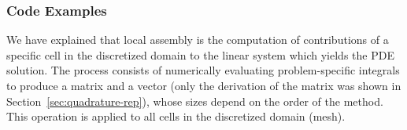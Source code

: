 %
%



\subsubsection{Code Examples}
\label{sec:bkg:mathcode}
We have explained that local assembly is the computation of contributions of a specific cell in the discretized domain to the linear system which yields the PDE solution. The process consists of numerically evaluating problem-specific integrals to produce a matrix and a vector (only the derivation of the matrix was shown in Section~\ref{sec:quadrature-rep}), whose sizes depend on the order of the method. This operation is applied to all cells in the discretized domain (mesh).

